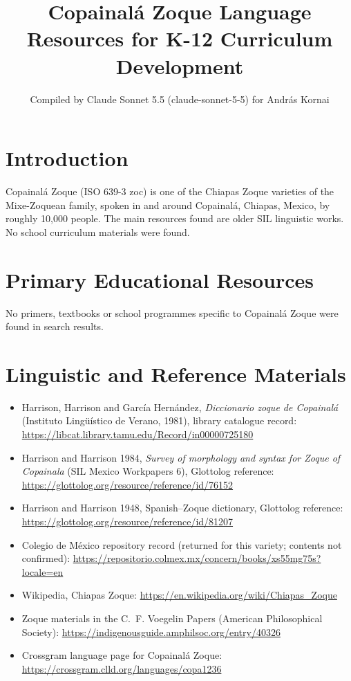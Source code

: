 \documentclass[12pt]{article}
\title{Copainal\'a Zoque Language Resources for K-12 Curriculum Development}
\author{Compiled by Claude Sonnet 5.5 (claude-sonnet-5-5) for Andr\'as Kornai}
\date{}
\begin{document}
\maketitle

\section{Introduction}
Copainal\'a Zoque (ISO 639-3 zoc) is one of the Chiapas Zoque varieties of the Mixe-Zoquean family, spoken in and around Copainal\'a, Chiapas, Mexico, by roughly 10,000 people. The main resources found are older SIL linguistic works. No school curriculum materials were found.

\section{Primary Educational Resources}
No primers, textbooks or school programmes specific to Copainal\'a Zoque were found in search results.

\section{Linguistic and Reference Materials}
\begin{itemize}
\item Harrison, Harrison and Garc\'ia Hern\'andez, \emph{Diccionario zoque de Copainal\'a} (Instituto Ling\"u\'istico de Verano, 1981), library catalogue record: \url{https://libcat.library.tamu.edu/Record/in00000725180}
\item Harrison and Harrison 1984, \emph{Survey of morphology and syntax for Zoque of Copainala} (SIL Mexico Workpapers 6), Glottolog reference: \url{https://glottolog.org/resource/reference/id/76152}
\item Harrison and Harrison 1948, Spanish--Zoque dictionary, Glottolog reference: \url{https://glottolog.org/resource/reference/id/81207}
\item Colegio de M\'exico repository record (returned for this variety; contents not confirmed): \url{https://repositorio.colmex.mx/concern/books/xs55mg75s?locale=en}
\item Wikipedia, Chiapas Zoque: \url{https://en.wikipedia.org/wiki/Chiapas_Zoque}
\item Zoque materials in the C.~F. Voegelin Papers (American Philosophical Society): \url{https://indigenousguide.amphilsoc.org/entry/40326}
\item Crossgram language page for Copainal\'a Zoque: \url{https://crossgram.clld.org/languages/copa1236}
\end{itemize}
\end{document}
